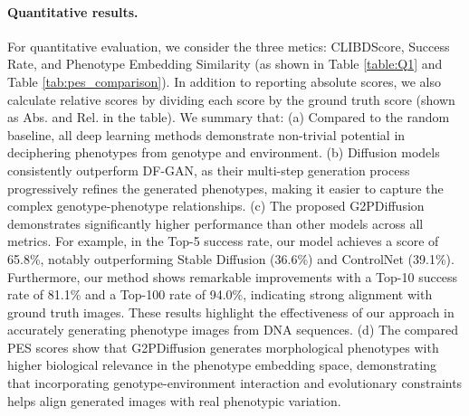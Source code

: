 \paragraph{Quantitative results.}
For quantitative evaluation, we consider the three metics: CLIBDScore, Success Rate, and Phenotype Embedding Similarity (as shown in Table \ref{table:Q1} and Table \ref{tab:pes_comparison}).
In addition to reporting absolute scores, we also calculate relative scores by dividing each score by the ground truth score (shown as Abs. and Rel. in the table). We summary that:
(a) Compared to the random baseline, all deep learning methods demonstrate non-trivial potential in deciphering phenotypes from genotype and environment. (b) Diffusion models consistently outperform DF-GAN, as their multi-step generation process progressively refines the generated phenotypes, making it easier to capture the complex genotype-phenotype relationships. (c) The proposed G2PDiffusion demonstrates significantly higher performance than other models across all metrics. For example, in the Top-5 success rate, our model achieves a score of 65.8\%, notably outperforming Stable Diffusion (36.6\%) and ControlNet (39.1\%). Furthermore, our method shows remarkable improvements with a Top-10 success rate of 81.1\% and a Top-100 rate of 94.0\%, indicating strong alignment with ground truth images. These results highlight the effectiveness of our approach in accurately generating phenotype images from DNA sequences. (d) The compared PES scores show that G2PDiffusion generates morphological phenotypes with higher biological relevance in the phenotype embedding space, demonstrating that incorporating genotype-environment interaction and evolutionary constraints helps align generated images with real phenotypic variation.

